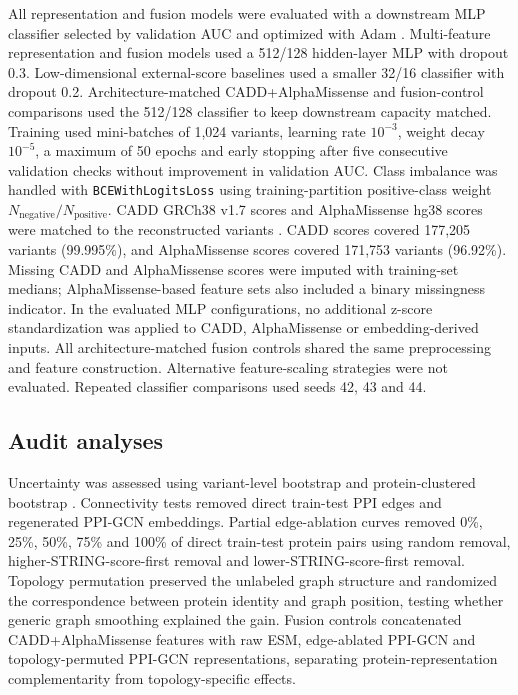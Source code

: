 \documentclass[conference]{IEEEtran}
\newcommand{\CADDAM}{CADD\allowbreak{}+\allowbreak{}AlphaMissense}
\begin{document}
All representation and fusion models were evaluated with a downstream MLP classifier selected by validation AUC and optimized with Adam \cite{Kingma2015Adam}. Multi-feature representation and fusion models used a 512/128 hidden-layer MLP with dropout 0.3. Low-dimensional external-score baselines used a smaller 32/16 classifier with dropout 0.2. Architecture-matched \CADDAM{} and fusion-control comparisons used the 512/128 classifier to keep downstream capacity matched. Training used mini-batches of 1,024 variants, learning rate $10^{-3}$, weight decay $10^{-5}$, a maximum of 50 epochs and early stopping after five consecutive validation checks without improvement in validation AUC. Class imbalance was handled with \texttt{BCEWithLogitsLoss} using training-partition positive-class weight $N_{\mathrm{negative}}/N_{\mathrm{positive}}$. CADD GRCh38 v1.7 scores and AlphaMissense hg38 scores were matched to the reconstructed variants \cite{Kircher2014CADD,Schubach2024CADDv17,Cheng2023AlphaMissense}. CADD scores covered 177,205 variants (99.995\%), and AlphaMissense scores covered 171,753 variants (96.92\%). Missing CADD and AlphaMissense scores were imputed with training-set medians; AlphaMissense-based feature sets also included a binary missingness indicator. In the evaluated MLP configurations, no additional z-score standardization was applied to CADD, AlphaMissense or embedding-derived inputs. All architecture-matched fusion controls shared the same preprocessing and feature construction. Alternative feature-scaling strategies were not evaluated. Repeated classifier comparisons used seeds 42, 43 and 44.

\subsection{Audit analyses}

Uncertainty was assessed using variant-level bootstrap and protein-clustered bootstrap \cite{Efron1993Bootstrap}. Connectivity tests removed direct train-test PPI edges and regenerated PPI-GCN embeddings. Partial edge-ablation curves removed 0\%, 25\%, 50\%, 75\% and 100\% of direct train-test protein pairs using random removal, higher-STRING-score-first removal and lower-STRING-score-first removal. Topology permutation preserved the unlabeled graph structure and randomized the correspondence between protein identity and graph position, testing whether generic graph smoothing explained the gain. Fusion controls concatenated \CADDAM{} features with raw ESM, edge-ablated PPI-GCN and topology-permuted PPI-GCN representations, separating protein-representation complementarity from topology-specific effects.
\end{document}
